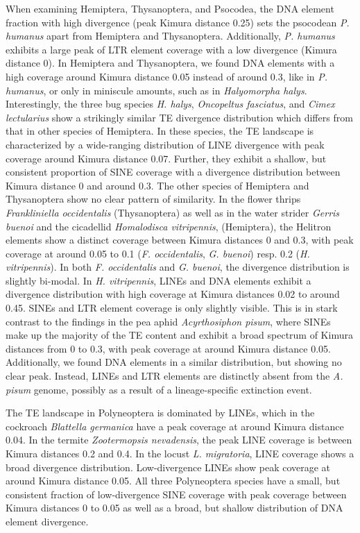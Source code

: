 When examining Hemiptera, Thysanoptera, and Psocodea, the DNA element
fraction with high divergence (peak Kimura distance 0.25) sets the
psocodean \emph{P. humanus} apart from Hemiptera and Thysanoptera.
Additionally, \emph{P. humanus} exhibits a large peak of LTR element
coverage with a low divergence (Kimura distance 0). In Hemiptera and
Thysanoptera, we found DNA elements with a high coverage around Kimura
distance 0.05 instead of around 0.3, like in \emph{P. humanus}, or only
in miniscule amounts, such as in \emph{Halyomorpha halys}.
Interestingly, the three bug species \emph{H. halys}, \emph{Oncopeltus
fasciatus}, and \emph{Cimex lectularius} show a strikingly similar TE
divergence distribution which differs from that in other species of
Hemiptera. In these species, the TE landscape is characterized by a
wide-ranging distribution of LINE divergence with peak coverage around
Kimura distance 0.07. Further, they exhibit a shallow, but consistent
proportion of SINE coverage with a divergence distribution between
Kimura distance 0 and around 0.3. The other species of Hemiptera and
Thysanoptera show no clear pattern of similarity. In the flower thrips
\emph{Frankliniella occidentalis} (Thysanoptera) as well as in the water
strider \emph{Gerris buenoi} and the cicadellid \emph{Homalodisca
vitripennis}, (Hemiptera), the Helitron elements show a distinct
coverage between Kimura distances 0 and 0.3, with peak coverage at
around 0.05 to 0.1 (\emph{F. occidentalis}, \emph{G. buenoi}) resp. 0.2
(\emph{H. vitripennis}). In both \emph{F. occidentalis} and \emph{G.
buenoi}, the divergence distribution is slightly bi-modal. In \emph{H.
vitripennis}, LINEs and DNA elements exhibit a divergence distribution
with high coverage at Kimura distances 0.02 to around 0.45. SINEs and
LTR element coverage is only slightly visible. This is in stark contrast
to the findings in the pea aphid \emph{Acyrthosiphon pisum}, where SINEs
make up the majority of the TE content and exhibit a broad spectrum of
Kimura distances from 0 to 0.3, with peak coverage at around Kimura
distance 0.05. Additionally, we found DNA elements in a similar
distribution, but showing no clear peak. Instead, LINEs and LTR elements
are distinctly absent from the \emph{A. pisum} genome, possibly as a
result of a lineage-specific extinction event.

The TE landscape in Polyneoptera is dominated by LINEs, which in the
cockroach \emph{Blattella germanica} have a peak coverage at around
Kimura distance 0.04. In the termite \emph{Zootermopsis nevadensis}, the
peak LINE coverage is between Kimura distances 0.2 and 0.4. In the
locust \emph{L. migratoria}, LINE coverage shows a broad divergence
distribution. Low-divergence LINEs show peak coverage at around Kimura
distance 0.05. All three Polyneoptera species have a small, but
consistent fraction of low-divergence SINE coverage with peak coverage
between Kimura distances 0 to 0.05 as well as a broad, but shallow
distribution of DNA element divergence.



